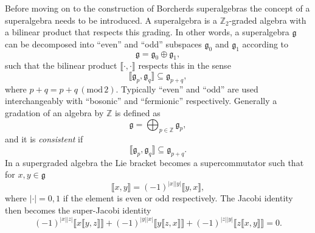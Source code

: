 Before moving on to the construction of Borcherds superalgebras the concept of a superalgebra needs to be introduced. A superalgebra is a $\mathbb{Z}_2$-graded algebra with a bilinear product that respects this grading. In other words, a superalgebra $\mathfrak{g}$ can be decomposed into ``even'' and ``odd'' subspaces $\mathfrak{g}_0$ and $\mathfrak{g}_1$ according to 
\begin{equation}
    \mathfrak{g} = \mathfrak{g}_0\oplus\mathfrak{g}_1,
\end{equation}
such that the bilinear product $\llbracket\cdot,\cdot\rrbracket$ respects this in the sense
\begin{equation}
    \llbracket\mathfrak{g}_p,\mathfrak{g}_q\rrbracket \subseteq \mathfrak{g}_{p+q},
\end{equation}
where $p+q = p+q\,(\text{mod}\,2)$. Typically ``even'' and ``odd'' are used interchangeably with ``bosonic'' and ``fermionic'' respectively. Generally a gradation of an algebra by $\mathbb{Z}$ is defined as 
\begin{equation}
    \mathfrak{g} = \bigoplus_{p\in\mathbb{Z}} \mathfrak{g}_{p},
\end{equation}
and it is \emph{consistent} if 
\begin{equation}
    \llbracket \mathfrak{g}_p,\mathfrak{g}_q\rrbracket\subseteq \mathfrak{g}_{p+q}.
\end{equation}
In a supergraded algebra the Lie bracket becomes a supercommutator such that for $x,y\in\mathfrak{g}$
\begin{equation}
    \llbracket x,y\rrbracket = \left(-1\right)^{|x||y|}\llbracket y,x\rrbracket,
\end{equation}
where $|\cdot|=0,1$ if the element is even or odd respectively. The Jacobi identity then becomes the super-Jacobi identity
\begin{equation}
    \left(-1\right)^{|x||z|}\llbracket x\llbracket y,z\rrbracket\rrbracket +\left(-1\right)^{|y||x|}\llbracket y\llbracket z,x\rrbracket\rrbracket+\left(-1\right)^{|z||y|}\llbracket z\llbracket x,y\rrbracket\rrbracket = 0.
\end{equation}

